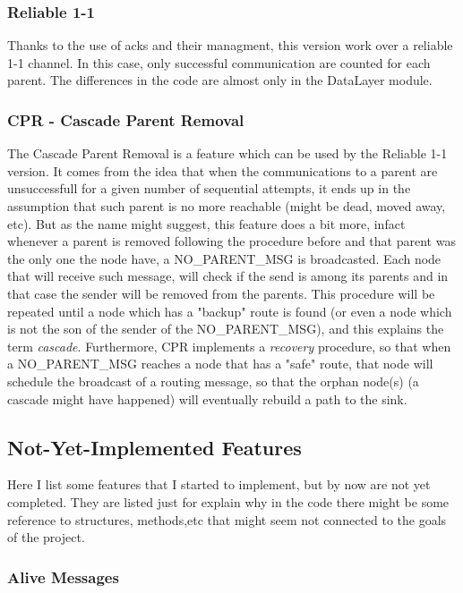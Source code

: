 \documentclass{article}
\begin{document}
		\subsubsection{Reliable 1-1}
	
Thanks to the use of acks and their managment, this version work over a reliable 1-1 channel. In this case, only successful communication are counted for each parent. The differences in the code are almost only in the DataLayer module.

		\subsubsection{CPR - Cascade Parent Removal}
	
The Cascade Parent Removal is a feature which can be used by the Reliable 1-1 version. It comes from the idea that when the communications to a parent are unsuccessfull for a given number of sequential attempts, it ends up in the assumption that such parent is no more reachable (might be dead, moved away, etc). But as the name might suggest, this feature does a bit more, infact whenever a parent is removed following the procedure before and that parent was the only one the node have, a NO\_PARENT\_MSG is broadcasted. Each node that will receive such message, will check if the send is among its parents and in that case the sender will be removed from the parents. This procedure will be repeated until  a node which has a "backup" route is found (or even a node which is not the son of the sender of the NO\_PARENT\_MSG), and this explains the term \textit{cascade}.
Furthermore, CPR implements a \textit{recovery} procedure, so that when a NO\_PARENT\_MSG reaches a node that has a "safe" route, that node will schedule the broadcast of a routing message, so that the orphan node(s) (a cascade might have happened) will eventually rebuild a path to the sink.

	\subsection{Not-Yet-Implemented Features}
Here I list some features that I started to implement, but by now are not yet completed. They are listed just for explain why in the code there might be some reference to structures, methods,etc that might seem not connected to the goals of the project.

		\subsubsection{Alive Messages}
	
\end{document}
